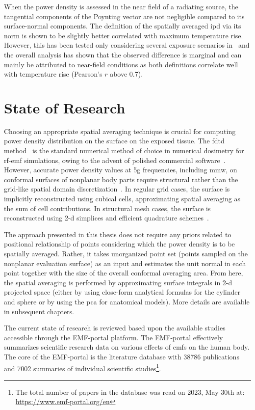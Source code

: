 When the power density is assessed in the near field of a radiating source, the tangential components of the Poynting vector are not negligible compared to its surface-normal components.
The definition of the spatially averaged \gls{ipd} via its norm is shown to be slightly better correlated with maximum temperature rise.
However, this has been tested only considering several exposure scenarios in~\cite{IEEE2021Guide} and the overall analysis has shown that the observed difference is marginal and can mainly be attributed to near-field conditions as both definitions correlate well with temperature rise (Pearson's $r$ above 0.7).

\section{State of Research}
Choosing an appropriate spatial averaging technique is crucial for computing power density distribution on the surface on the exposed tissue.
The \gls{fdtd} method~\cite{Sullivan1987Use} is the standard numerical method of choice in numerical dosimetry for \gls{rf}-\gls{emf} simulations, owing to the advent of polished commercial software~\cite{Hirata2021Human}.
However, accurate power density values at \gls{5g} frequencies, including \gls{mmw}, on conformal surfaces of nonplanar body parts require structural rather than the grid-like spatial domain discretization~\cite{Poljak2018conformal}.
In regular grid cases, the surface is implicitly reconstructed using cubical cells, approximating spatial averaging as the sum of cell contributions.
In structural mesh cases, the surface is reconstructed using \gls{2-d} simplices and efficient quadrature schemes~\cite{Dunavant1985High,Dunavant1985Economical}.

The approach presented in this thesis does not require any priors related to positional relationship of points considering which the power density is to be spatially averaged.
Rather, it takes unorganized point set (points sampled on the nonplanar evaluation surface) as an input and estimates the unit normal in each point together with the size of the overall conformal averaging area.
From here, the spatial averaging is performed by approximating surface integrals in \gls{2-d} projected space (either by using close-form analytical formulas for the cylinder and sphere or by using the \gls{pca} for anatomical models).
More details are available in subsequent chapters.

The current state of research is reviewed based upon the available studies accessible through the EMF-portal platform.
The EMF-portal effectively summarizes scientific research data on various effects of \gls{emf}s on the human body.
The core of the EMF-portal is the literature database with \num{38786} publications and \num{7002} summaries of individual scientific studies\footnote{The total number of papers in the database was read on 2023, May 30th at: \url{https://www.emf-portal.org/en}}.

